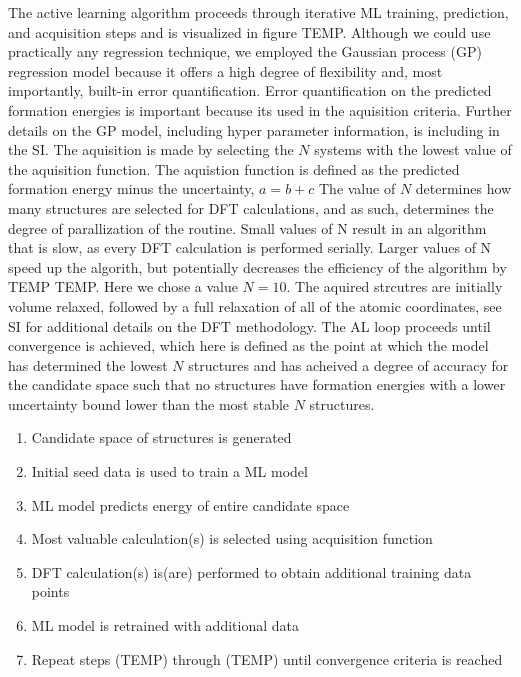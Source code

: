 The active learning algorithm proceeds through iterative ML training, prediction, and acquisition steps and is visualized in figure TEMP.
%
Although we could use practically any regression technique, we employed the Gaussian process (GP) regression model because it offers a high degree of flexibility and, most importantly, built-in error quantification.
Error quantification on the predicted formation energies is important because its used in the aquisition criteria.
%
Further details on the GP model, including hyper parameter information, is including in the SI.
%
The aquisition is made by selecting the $N$ systems with the lowest value of the aquisition function.
%
The aquistion function is defined as the predicted formation energy minus the uncertainty,
$a = b + c$
%
The value of $N$ determines how many structures are selected for DFT calculations,
and as such, determines the degree of parallization of the routine.
%
Small values of N result in an algorithm that is slow, as every DFT calculation is performed serially.
Larger values of N speed up the algorith, but potentially decreases the efficiency of the algorithm by TEMP TEMP.
%
Here we chose a value $N=10$.
%
The aquired strcutres are initially volume relaxed, followed by a full relaxation of all of the atomic coordinates,
see SI for additional details on the DFT methodology.
The AL loop proceeds until convergence is achieved, which here is defined as the point at which the model has determined the lowest $N$ structures and has acheived a degree of accuracy for the candidate space such that no structures have formation energies with a lower uncertainty bound lower than the most stable $N$ structures.



\begin{enumerate}
  \item Candidate space of structures is generated
  \item Initial seed data is used to train a ML model
  \item ML model predicts energy of entire candidate space
  \item Most valuable calculation(s) is selected using acquisition function
  \item DFT calculation(s) is(are) performed to obtain additional training data points
  \item ML model is retrained with additional data
  \item Repeat steps (TEMP) through (TEMP) until convergence criteria is reached
\end{enumerate}

